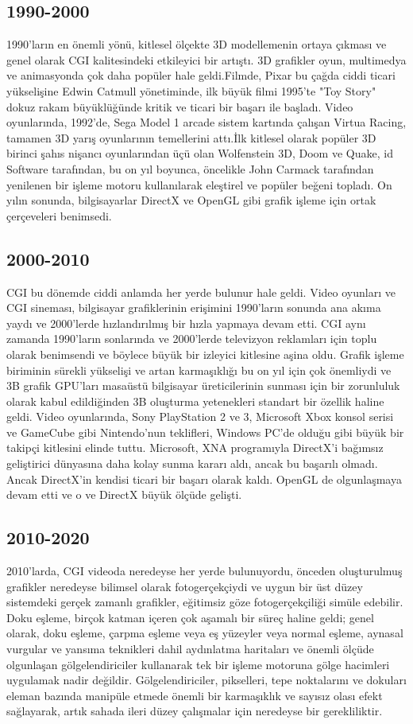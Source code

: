 \documentclass{IEEEtran}
\begin{document}
\subsection{1990-2000}
1990'ların en önemli yönü, kitlesel ölçekte 3D modellemenin ortaya çıkması ve genel olarak CGI kalitesindeki etkileyici bir artıştı. 3D grafikler oyun, multimedya ve animasyonda çok daha popüler hale geldi.Filmde, Pixar bu çağda ciddi ticari yükselişine Edwin Catmull yönetiminde, ilk büyük filmi 1995'te "Toy Story" dokuz rakam büyüklüğünde kritik ve ticari bir başarı ile başladı. Video oyunlarında, 1992'de, Sega Model 1 arcade sistem kartında çalışan Virtua Racing, tamamen 3D yarış oyunlarının temellerini attı.İlk kitlesel olarak popüler 3D birinci şahıs nişancı oyunlarından üçü olan Wolfenstein 3D, Doom ve Quake, id Software tarafından, bu on yıl boyunca, öncelikle John Carmack tarafından yenilenen bir işleme motoru kullanılarak eleştirel ve popüler beğeni topladı. On yılın sonunda, bilgisayarlar DirectX ve OpenGL gibi grafik işleme için ortak çerçeveleri benimsedi.
\subsection{2000-2010}
CGI bu dönemde ciddi anlamda her yerde bulunur hale geldi. Video oyunları ve CGI sineması, bilgisayar grafiklerinin erişimini 1990'ların sonunda ana akıma yaydı ve 2000'lerde hızlandırılmış bir hızla yapmaya devam etti. CGI aynı zamanda 1990'ların sonlarında ve 2000'lerde televizyon reklamları için toplu olarak benimsendi ve böylece büyük bir izleyici kitlesine aşina oldu. Grafik işleme biriminin sürekli yükselişi ve artan karmaşıklığı bu on yıl için çok önemliydi ve 3B grafik GPU'ları masaüstü bilgisayar üreticilerinin sunması için bir zorunluluk olarak kabul edildiğinden 3B oluşturma yetenekleri standart bir özellik haline geldi. Video oyunlarında, Sony PlayStation 2 ve 3, Microsoft Xbox konsol serisi ve GameCube gibi Nintendo'nun teklifleri, Windows PC'de olduğu gibi büyük bir takipçi kitlesini elinde tuttu. Microsoft, XNA programıyla DirectX'i bağımsız geliştirici dünyasına daha kolay sunma kararı aldı, ancak bu başarılı olmadı. Ancak DirectX'in kendisi ticari bir başarı olarak kaldı. OpenGL de olgunlaşmaya devam etti ve o ve DirectX büyük ölçüde gelişti.
\subsection{2010-2020}
2010'larda, CGI videoda neredeyse her yerde bulunuyordu, önceden oluşturulmuş grafikler neredeyse bilimsel olarak fotogerçekçiydi ve uygun bir üst düzey sistemdeki gerçek zamanlı grafikler, eğitimsiz göze fotogerçekçiliği simüle edebilir. Doku eşleme, birçok katman içeren çok aşamalı bir süreç haline geldi; genel olarak, doku eşleme, çarpma eşleme veya eş yüzeyler veya normal eşleme, aynasal vurgular ve yansıma teknikleri dahil aydınlatma haritaları ve önemli ölçüde olgunlaşan gölgelendiriciler kullanarak tek bir işleme motoruna gölge hacimleri uygulamak nadir değildir. Gölgelendiriciler, pikselleri, tepe noktalarını ve dokuları eleman bazında manipüle etmede önemli bir karmaşıklık ve sayısız olası efekt sağlayarak, artık sahada ileri düzey çalışmalar için neredeyse bir gerekliliktir. 
\end{document}
